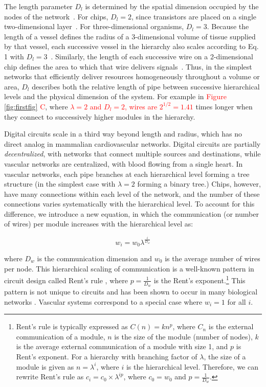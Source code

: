 \documentclass[12pt]{article}
\newcommand{\red}[1]{\textcolor{red}{#1}}
\begin{document}
The length parameter $D_l$ is determined by the spatial dimension occupied by the
nodes of the network~\cite{mandelbrot83}.  For chips, $D_l = 2$, since
transistors are placed on a single two-dimensional layer~\cite{donath81}. For
three-dimensional organisms,  $D_l = 3$. Because the length of a
vessel defines the radius of a 3-dimensional volume of tissue supplied
by that vessel, each successive vessel in the hierarchy also scales
according to Eq. 1 with $D_l = 3$~\cite{west97, banavar10}. Similarly,
the length of each successive wire on a 2-dimensional chip defines the
area to which that wire delivers signals~\cite{moses08}. Thus, in the simplest networks that efficiently deliver resources homogeneously throughout a volume or area, $D_l$ describes both the relative length of pipe between successive hierarchical levels and the physical
dimension of the system. For example in \red{Figure \ref{fig:firstfig} C}, where \red{$\lambda = 2$ and $D_l = 2$, wires are $2^{1/2} = 1.41$} times longer when they connect to successively higher modules in the hierarchy.

Digital circuits scale in a third way beyond length and radius, which
has no direct analog in mammalian cardiovascular networks. Digital circuits are partially \emph{decentralized}, with networks that connect multiple sources and destinations, while vascular networks are
centralized, with blood flowing from a single heart. 
In vascular networks, each pipe
branches at each hierarchical level forming a tree structure
(in the simplest case with $\lambda = 2$ forming
a binary tree.) Chips, however, have many connections within each
level of the network, and the number of these connections
varies systematically with the hierarchical level.  
 To account for
this difference, we introduce a new equation, in which the
communication (or number of wires) per module increases with the
hierarchical level as:  

\begin{equation}
  w_i = w_0 \lambda^{\frac{i}{D_w}}
\label{eq:communication}
\end{equation}

\noindent where $D_w$ is the communication dimension and $w_0$ is the average
number of wires per node.  This hierarchical scaling of communication is a
well-known pattern in circuit design called Rent's rule \cite{christie00},
where $p = \frac{1}{D_w}$ is the Rent's exponent.\footnote{Rent's rule is typically
  expressed as $C(n) = kn^p$, where $C_n$ is the external communication of a
  module, $n$ is the size of the module (number of nodes), $k$ is the average
  external communication of a module with size 1, and $p$ is Rent's
  exponent. For a hierarchy with branching factor of $\lambda$, the size of a
  module is given as $n = \lambda^i$, where $i$ is the hierarchical level.
  Therefore, we can rewrite Rent's rule as $c_i = c_0 \times \lambda^{ip}$,
where $c_0 = w_0$ and $p = \frac{1}{D_w}$.} This pattern is not unique to circuits
and has been shown to occur in many biological networks
\cite{reda09,bassett10,meunier2010modular,solee2013evolutionary}.   Vascular systems correspond to a special case where 
$w_i = 1$ for all $i$. 
\end{document}
